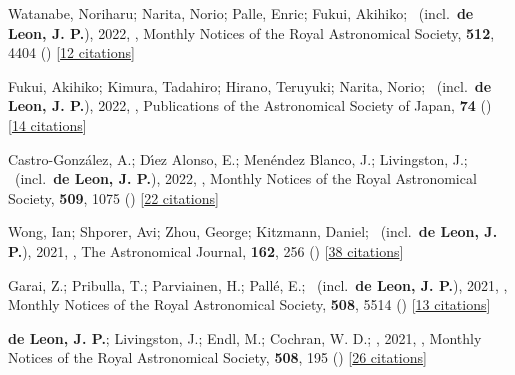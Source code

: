 \item[{\color{numcolor}\scriptsize44}] Watanabe, Noriharu; Narita, Norio; Palle, Enric; Fukui, Akihiko; \etal\ (incl.\ \textbf{de Leon, J. P.}), 2022, , Monthly Notices of the Royal Astronomical Society, \textbf{512}, 4404 () [\href{https://ui.adsabs.harvard.edu/abs/2022MNRAS.512.4404W}{12 citations}]

\item[{\color{numcolor}\scriptsize43}] Fukui, Akihiko; Kimura, Tadahiro; Hirano, Teruyuki; Narita, Norio; \etal\ (incl.\ \textbf{de Leon, J. P.}), 2022, , Publications of the Astronomical Society of Japan, \textbf{74} () [\href{https://ui.adsabs.harvard.edu/abs/2022PASJ...74L...1F}{14 citations}]

\item[{\color{numcolor}\scriptsize42}] Castro-Gonz{\'a}lez, A.; D{\'\i}ez Alonso, E.; Men{\'e}ndez Blanco, J.; Livingston, J.; \etal\ (incl.\ \textbf{de Leon, J. P.}), 2022, , Monthly Notices of the Royal Astronomical Society, \textbf{509}, 1075 () [\href{https://ui.adsabs.harvard.edu/abs/2022MNRAS.509.1075C}{22 citations}]

\item[{\color{numcolor}\scriptsize41}] Wong, Ian; Shporer, Avi; Zhou, George; Kitzmann, Daniel; \etal\ (incl.\ \textbf{de Leon, J. P.}), 2021, , The Astronomical Journal, \textbf{162}, 256 () [\href{https://ui.adsabs.harvard.edu/abs/2021AJ....162..256W}{38 citations}]

\item[{\color{numcolor}\scriptsize40}] Garai, Z.; Pribulla, T.; Parviainen, H.; Pall{\'e}, E.; \etal\ (incl.\ \textbf{de Leon, J. P.}), 2021, , Monthly Notices of the Royal Astronomical Society, \textbf{508}, 5514 () [\href{https://ui.adsabs.harvard.edu/abs/2021MNRAS.508.5514G}{13 citations}]

\item[{\color{numcolor}\scriptsize39}] \textbf{de Leon, J. P.}; Livingston, J.; Endl, M.; Cochran, W. D.; \etal, 2021, , Monthly Notices of the Royal Astronomical Society, \textbf{508}, 195 () [\href{https://ui.adsabs.harvard.edu/abs/2021MNRAS.508..195D}{26 citations}]

